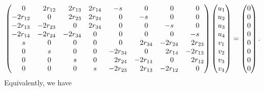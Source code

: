 \documentclass[pdftex]{sigma}
\numberwithin{equation}{section}
\theoremstyle{definition}
\newcommand{\0}{\boldsymbol{0}}
\begin{document}
\begin{gather}
\begin{pmatrix}
\hphantom{-}0 & \hphantom{-}2r_{12} & \hphantom{-}2r_{13} & 2r_{14} & -s & \hphantom{-}0 & \hphantom{-}0 & \hphantom{-}0
\\
-2r_{12} & \hphantom{-}0 & \hphantom{-}2r_{23} &2r_{24} & \hphantom{-}0 & -s & \hphantom{-}0 & \hphantom{-}0
\\
-2r_{13} & -2r_{23} & \hphantom{-}0 & 2r_{34} & \hphantom{-}0 & \hphantom{-}0 & -s & \hphantom{-}0
\\
-2 r_{14} & -2r_{24} & -2r_{34} & 0 & \hphantom{-}0 & \hphantom{-}0 & \hphantom{-}0 & -s
\\
\hphantom{-}s & \hphantom{-}0 & \hphantom{-}0 & 0 & \hphantom{-}0 & \hphantom{-}2r_{34} & -2r_{24} & \hphantom{-}2r_{23}
\\
\hphantom{-}0 & \hphantom{-}s & \hphantom{-}0 & 0 & -2r_{34} & \hphantom{-}0 & \hphantom{-}2r_{14} & -2r_{13}
\\
\hphantom{-}0 & \hphantom{-}0 & \hphantom{-}s & 0 & \hphantom{-}2r_{24} & -2r_{14} & \hphantom{-}0 & \hphantom{-}2r_{12}
\\
\hphantom{-}0 & \hphantom{-}0 & \hphantom{-}0 & s & -2r_{23} & \hphantom{-}2r_{13} & -2r_{12} & \hphantom{-}0
\end{pmatrix}
\begin{pmatrix}
u_1
\\
u_2
\\
u_3
\\
u_4
\\
v_1
\\
v_2
\\
v_3
\\
v_4
\end{pmatrix} =
\begin{pmatrix}
0
\\
0
\\
0
\\
0
\\
0
\\
0
\\
0
\\
0
\end{pmatrix}. \label{star}
\end{gather}
Equivalently, we have
\end{document}
